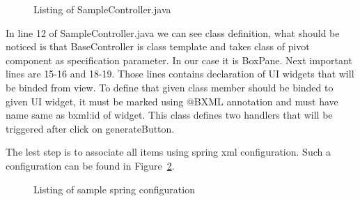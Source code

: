 \pagebreak

\begin{figure}[ht]
  \centering
    
  \caption{Listing of SampleController.java}
  \label{fig:sample_controller}
\end{figure} 

In line 12 of SampleController.java we can see class definition, what should be noticed is that BaseController is
class template and takes class of pivot component as specification parameter. In our case it is BoxPane. Next important
lines are 15-16 and 18-19. Those lines contains declaration of UI widgets that will be binded from view. To define that
given class member should be binded to given UI widget, it must be marked using @BXML annotation and must have name same
as bxml:id of widget. This class defines two handlers that will be triggered after click on generateButton.  

\pagebreak
The lest step is to associate all items using spring xml configuration. Such a configuration can be found in
Figure~\ref{fig:sample_spring}.


\begin{figure}[ht]
  \centering
    
  \caption{Listing of sample spring configuration}
  \label{fig:sample_spring}
\end{figure}

 